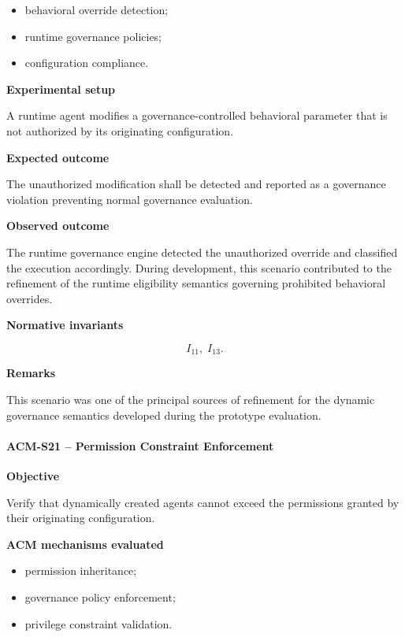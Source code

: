 \documentclass[10pt]{article}
\begin{document}
\begin{itemize}
    \item behavioral override detection;
    \item runtime governance policies;
    \item configuration compliance.
\end{itemize}

\textbf{Experimental setup}

A runtime agent modifies a governance-controlled behavioral parameter that is
not authorized by its originating configuration.

\textbf{Expected outcome}

The unauthorized modification shall be detected and reported as a governance
violation preventing normal governance evaluation.

\textbf{Observed outcome}

The runtime governance engine detected the unauthorized override and classified
the execution accordingly. During development, this scenario contributed to the
refinement of the runtime eligibility semantics governing prohibited
behavioral overrides.

\textbf{Normative invariants}

\[
I_{11},\;
I_{13}.
\]

\textbf{Remarks}

This scenario was one of the principal sources of refinement for the dynamic
governance semantics developed during the prototype evaluation.

\paragraph{ACM-S21 -- Permission Constraint Enforcement}

\textbf{Objective}

Verify that dynamically created agents cannot exceed the permissions granted by
their originating configuration.

\textbf{ACM mechanisms evaluated}

\begin{itemize}
    \item permission inheritance;
    \item governance policy enforcement;
    \item privilege constraint validation.
\end{itemize}
\end{document}
